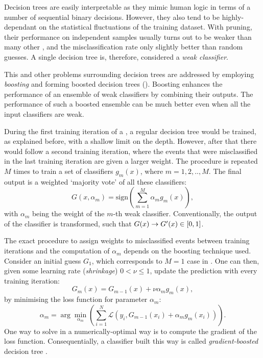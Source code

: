 Decision trees are easily interpretable as they mimic human logic in terms of a number of sequential binary decisions.
However, they also tend to be highly-dependant on the statistical fluctuations of the training dataset.
With pruning, their performance on independent samples usually turns out to be weaker than many other , and the misclassification rate only slightly better than random guesses.
A single decision tree is, therefore, considered a \textit{weak classifier}.

This and other problems surrounding decision trees are addressed by employing \textit{boosting} and forming boosted decision trees ().
Boosting enhances the performance of an ensemble of weak classifiers by combining their outputs. 
The performance of such a boosted ensemble can be much better even when all the input classifiers are weak.

During the first training iteration of a \BDT, a regular decision tree would be trained, as explained before, with a shallow limit on the depth.
However, after that there would follow a second training iteration, where the events that were misclassified in the last training iteration are given a larger weight.
The procedure is repeated $M$ times to train a set of classifiers $g_{m}(x)$, where $m=1,2,..,M$.
The final output is a weighted `majority vote' of all these classifiers:
\begin{equation}\label{eq:boosted_classifier}
    G(x, \alpha_m) = \mathrm{sign}(\sum_{m=1}^M\alpha_mg_m(x)),
\end{equation}
with $\alpha_m$ being the weight of the $m$-th weak classifier.
Conventionally, the output of the classifier is transformed, such that $G(x)\rightarrow G'(x)\in[0,1]$.

The exact procedure to assign weights to misclassified events between training iterations and the computation of $\alpha_m$ depends on the boosting technique used.
Consider an initial guess $G_1$, which corresponds to $M=1$ case in .
One can then, given some learning rate (\textit{shrinkage}) $0<\nu\leq1$, update the prediction with every training iteration:
\begin{equation}
    G_m(x) = G_{m-1}(x) + \nu\alpha_mg_m(x),
\end{equation}
by minimising the loss function for parameter $\alpha_m$: 
\begin{equation}\label{eq:minimize_loss}
    \alpha_m = \arg\min_{\alpha_m}\left(\sum_{i=1}^N\mathcal{L}(y_i, G_{m-1}(x_i) + \alpha_mg_m(x_i))\right).
\end{equation}
One way to solve  in a numerically-optimal way is to compute the gradient of the loss function.
Consequentially, a classifier built this way is called \textit{gradient-boosted} decision tree \cite{FRIEDMAN1013203451}.

